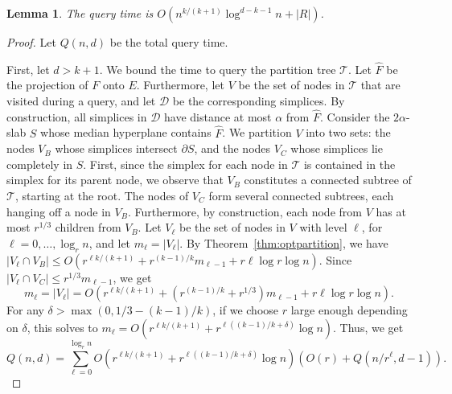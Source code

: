 \documentclass[a4paper,11pt]{paper}
\newtheorem{lemma}[theorem]{Lemma}
\begin{document}
\begin{lemma}
  \label{lem:querytime}
  The query time is $O(n^{k/(k+1)}\log^{d-k-1} n + |R|)$.
\end{lemma}
\begin{proof}
  Let $Q(n,d)$ be the total query time.

  First, let $d > k+1$.
  We bound the time to query the partition tree $\mathcal{T}$.
  Let $\widehat{F}$ be the projection of $F$ onto $E$.
  Furthermore, let $V$ be the set of nodes in $\mathcal{T}$ that
  are visited during a query, and let $\mathcal{D}$ be the
  corresponding
  simplices. By construction, all simplices in $\mathcal{D}$
  have distance at most $\alpha$ from $\widehat{F}$.
  Consider the $2\alpha$-slab $S$ whose
  median hyperplane contains $\widehat{F}$.
  We partition $V$ into two sets: the nodes
  $V_B$ whose simplices intersect $\partial S$, and the nodes
  $V_C$ whose simplices lie completely in $S$.
  First, since the simplex for each node in $\mathcal{T}$ is
  contained in the simplex for its parent node, we observe that
  $V_B$ constitutes a connected subtree of $\mathcal{T}$, starting
  at the root.  The nodes of $V_C$ form several connected subtrees,
  each hanging off a node in $V_B$. Furthermore, by construction,
  each node from $V$ has at most $r^{1/3}$ children from $V_B$.
  Let $V_\ell$ be the set of nodes in $V$ with level $\ell$,
  for $\ell = 0, \dots, \log_r n$,
  and let $m_\ell = |V_\ell|$.
  By Theorem~\ref{thm:optpartition}, we have
  $|V_\ell \cap V_B| \leq
  O(r^{\ell k/(k+1)} + r^{(k-1)/k}m_{\ell - 1} +
  r\ell \log r \log n)$. Since
  $|V_\ell \cap V_C| \leq r^{1/3} m_{\ell - 1}$,
  we get
  \[
    m_\ell = |V_\ell| =
    O\left(r^{\ell k/(k+1)} + (r^{(k-1)/k} + r^{1/3})m_{\ell-1} +
    r\ell \log r \log n\right).
  \]
  For any $\delta > \max(0, 1/3-(k-1)/k)$, if we choose
  $r$ large enough depending on $\delta$, this solves to
  $m_\ell = O(r^{\ell k/(k+1)} +
  r^{\ell ((k-1)/k + \delta)}\log n)$.
  Thus, we get
  \begin{equation}\label{equ:qrec}
    Q(n, d) =
    \sum_{\ell = 0}^{\log_r n} O(r^{\ell k/(k+1)} +
  r^{\ell ((k-1)/k + \delta)}\log n)(O(r)  + Q(n/r^{\ell}, d-1)).
  \end{equation}


\end{proof}
\end{document}
